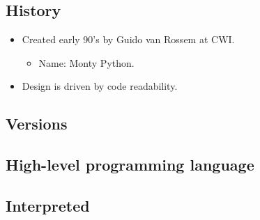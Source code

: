 \documentclass[aspectratio=1610,slidestop]{beamer}
\begin{document}
\subsection{History}
\begin{pframe}
 \begin{itemize}
  \item Created early 90's by Guido van Rossem at CWI.
  \begin{itemize}
   \item Name: Monty Python.
  \end{itemize}
  \item Design is driven by code readability.
 \end{itemize}
\end{pframe}

\subsection{Versions}
\begin{pframe}
 \begin{center}
   
 \end{center}
\end{pframe}


\subsection{High-level programming language}
\begin{pframe}
 \begin{center}
   
 \end{center}
\end{pframe}


\subsection{Interpreted}
\begin{pframe}
 \begin{center}
   
 \end{center}
\end{pframe}
\end{document}
